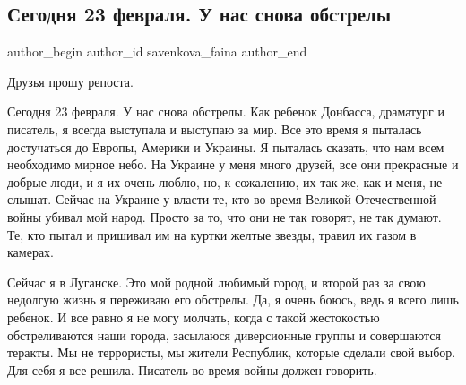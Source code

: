  
 
 
 
 
 
\subsection{Сегодня 23 февраля. У нас снова обстрелы}
\label{sec:23_02_2022.fb.savenkova_faina.1.obstrely}
 
\ifcmt
 author_begin
   author_id savenkova_faina
 author_end
\fi

Друзья прошу репоста.


Сегодня 23 февраля. У нас снова обстрелы. Как ребенок Донбасса, драматург и
писатель, я всегда выступала и выступаю за мир. Все это время я пыталась
достучаться до Европы, Америки и Украины. Я пыталась сказать, что нам всем
необходимо мирное небо. На Украине у меня много друзей, все они прекрасные и
добрые люди, и я их очень люблю, но, к сожалению, их так же, как и меня, не
слышат. Сейчас на Украине у власти те, кто во время Великой Отечественной войны
убивал мой народ. Просто за то, что они не так говорят, не так думают. Те, кто
пытал и пришивал им на куртки желтые звезды, травил их газом в камерах. 

Сейчас я в Луганске. Это мой родной любимый город, и второй раз за свою
недолгую жизнь я переживаю его обстрелы. Да, я очень боюсь, ведь я всего лишь
ребенок. И все равно я не могу молчать, когда с такой жестокостью
обстреливаются наши города, засылаюся диверсионные группы и совершаются
теракты. Мы не террористы, мы жители Республик, которые сделали свой выбор. Для
себя я все решила. Писатель во время войны должен говорить.
